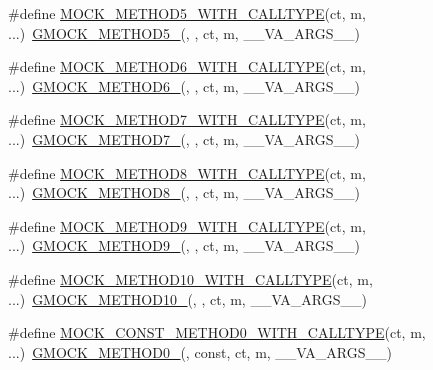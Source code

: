 \begin{DoxyCompactItemize}
\item 
\#define \hyperlink{gmock-generated-function-mockers_8h_a195de665a5ab83cf56ac9562ccc73838}{M\+O\+C\+K\+\_\+\+M\+E\+T\+H\+O\+D5\+\_\+\+W\+I\+T\+H\+\_\+\+C\+A\+L\+L\+T\+Y\+PE}(ct,  m, ...)~\hyperlink{gmock-generated-function-mockers_8h_a9e3ecd392499ab19a4a6d3adcabf56f6}{G\+M\+O\+C\+K\+\_\+\+M\+E\+T\+H\+O\+D5\+\_\+}(, , ct, m, \+\_\+\+\_\+\+V\+A\+\_\+\+A\+R\+G\+S\+\_\+\+\_\+)
\item 
\#define \hyperlink{gmock-generated-function-mockers_8h_a1e55bb6ae5cfcb0403c867541f5f0931}{M\+O\+C\+K\+\_\+\+M\+E\+T\+H\+O\+D6\+\_\+\+W\+I\+T\+H\+\_\+\+C\+A\+L\+L\+T\+Y\+PE}(ct,  m, ...)~\hyperlink{gmock-generated-function-mockers_8h_ad0ca7f6973a076d0af4c953f8ed91842}{G\+M\+O\+C\+K\+\_\+\+M\+E\+T\+H\+O\+D6\+\_\+}(, , ct, m, \+\_\+\+\_\+\+V\+A\+\_\+\+A\+R\+G\+S\+\_\+\+\_\+)
\item 
\#define \hyperlink{gmock-generated-function-mockers_8h_a696e2f91735b99b2a37c369a74bad647}{M\+O\+C\+K\+\_\+\+M\+E\+T\+H\+O\+D7\+\_\+\+W\+I\+T\+H\+\_\+\+C\+A\+L\+L\+T\+Y\+PE}(ct,  m, ...)~\hyperlink{gmock-generated-function-mockers_8h_ab98a8399ba62b53b375c2807f4d39d2f}{G\+M\+O\+C\+K\+\_\+\+M\+E\+T\+H\+O\+D7\+\_\+}(, , ct, m, \+\_\+\+\_\+\+V\+A\+\_\+\+A\+R\+G\+S\+\_\+\+\_\+)
\item 
\#define \hyperlink{gmock-generated-function-mockers_8h_a5d207db39768c12d6fecab03cfbe4d75}{M\+O\+C\+K\+\_\+\+M\+E\+T\+H\+O\+D8\+\_\+\+W\+I\+T\+H\+\_\+\+C\+A\+L\+L\+T\+Y\+PE}(ct,  m, ...)~\hyperlink{gmock-generated-function-mockers_8h_aa84a36427c44505207b7cad5dec7ad67}{G\+M\+O\+C\+K\+\_\+\+M\+E\+T\+H\+O\+D8\+\_\+}(, , ct, m, \+\_\+\+\_\+\+V\+A\+\_\+\+A\+R\+G\+S\+\_\+\+\_\+)
\item 
\#define \hyperlink{gmock-generated-function-mockers_8h_a38494187d78c6a395f78c074d204f593}{M\+O\+C\+K\+\_\+\+M\+E\+T\+H\+O\+D9\+\_\+\+W\+I\+T\+H\+\_\+\+C\+A\+L\+L\+T\+Y\+PE}(ct,  m, ...)~\hyperlink{gmock-generated-function-mockers_8h_aa820171a19cc587c247dbe05cbffc55f}{G\+M\+O\+C\+K\+\_\+\+M\+E\+T\+H\+O\+D9\+\_\+}(, , ct, m, \+\_\+\+\_\+\+V\+A\+\_\+\+A\+R\+G\+S\+\_\+\+\_\+)
\item 
\#define \hyperlink{gmock-generated-function-mockers_8h_af9641034cbd1f178dacd3515633d951f}{M\+O\+C\+K\+\_\+\+M\+E\+T\+H\+O\+D10\+\_\+\+W\+I\+T\+H\+\_\+\+C\+A\+L\+L\+T\+Y\+PE}(ct,  m, ...)~\hyperlink{gmock-generated-function-mockers_8h_a81a48223a8771de36ef92ac6d56f6e81}{G\+M\+O\+C\+K\+\_\+\+M\+E\+T\+H\+O\+D10\+\_\+}(, , ct, m, \+\_\+\+\_\+\+V\+A\+\_\+\+A\+R\+G\+S\+\_\+\+\_\+)
\item 
\#define \hyperlink{gmock-generated-function-mockers_8h_a001804410911b4ae2bc6f02a45a467e4}{M\+O\+C\+K\+\_\+\+C\+O\+N\+S\+T\+\_\+\+M\+E\+T\+H\+O\+D0\+\_\+\+W\+I\+T\+H\+\_\+\+C\+A\+L\+L\+T\+Y\+PE}(ct,  m, ...)~\hyperlink{gmock-generated-function-mockers_8h_ae0d290ffa58d7c624b2e3487ba1252f4}{G\+M\+O\+C\+K\+\_\+\+M\+E\+T\+H\+O\+D0\+\_\+}(, const, ct, m, \+\_\+\+\_\+\+V\+A\+\_\+\+A\+R\+G\+S\+\_\+\+\_\+)

\end{DoxyCompactItemize}
